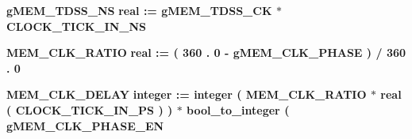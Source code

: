 \begin{DoxyCompactItemize}
\item 
{\bf g\+M\+E\+M\+\_\+\+T\+D\+S\+S\+\_\+\+NS} {\bfseries \textcolor{comment}{real}\textcolor{vhdlchar}{ }\textcolor{vhdlchar}{ }\textcolor{vhdlchar}{\+:}\textcolor{vhdlchar}{=}\textcolor{vhdlchar}{ }\textcolor{vhdlchar}{ }\textcolor{vhdlchar}{ }\textcolor{vhdlchar}{ }{\bfseries {\bf g\+M\+E\+M\+\_\+\+T\+D\+S\+S\+\_\+\+CK}} \textcolor{vhdlchar}{$\ast$}\textcolor{vhdlchar}{ }\textcolor{vhdlchar}{ }\textcolor{vhdlchar}{ }{\bfseries {\bf C\+L\+O\+C\+K\+\_\+\+T\+I\+C\+K\+\_\+\+I\+N\+\_\+\+NS}} \textcolor{vhdlchar}{ }} 
\item 
{\bf M\+E\+M\+\_\+\+C\+L\+K\+\_\+\+R\+A\+T\+IO} {\bfseries \textcolor{comment}{real}\textcolor{vhdlchar}{ }\textcolor{vhdlchar}{ }\textcolor{vhdlchar}{\+:}\textcolor{vhdlchar}{=}\textcolor{vhdlchar}{ }\textcolor{vhdlchar}{(}\textcolor{vhdlchar}{ }\textcolor{vhdlchar}{ } \textcolor{vhdldigit}{360} \textcolor{vhdlchar}{.} \textcolor{vhdldigit}{0} \textcolor{vhdlchar}{-\/}\textcolor{vhdlchar}{ }\textcolor{vhdlchar}{ }\textcolor{vhdlchar}{ }{\bfseries {\bf g\+M\+E\+M\+\_\+\+C\+L\+K\+\_\+\+P\+H\+A\+SE}} \textcolor{vhdlchar}{ }\textcolor{vhdlchar}{)}\textcolor{vhdlchar}{ }\textcolor{vhdlchar}{/}\textcolor{vhdlchar}{ } \textcolor{vhdldigit}{360} \textcolor{vhdlchar}{.} \textcolor{vhdldigit}{0} \textcolor{vhdlchar}{ }} 
\item 
{\bf M\+E\+M\+\_\+\+C\+L\+K\+\_\+\+D\+E\+L\+AY} {\bfseries \textcolor{comment}{integer}\textcolor{vhdlchar}{ }\textcolor{vhdlchar}{ }\textcolor{vhdlchar}{\+:}\textcolor{vhdlchar}{=}\textcolor{vhdlchar}{ }\textcolor{vhdlchar}{ }\textcolor{vhdlchar}{ }\textcolor{vhdlchar}{ }\textcolor{comment}{integer}\textcolor{vhdlchar}{ }\textcolor{vhdlchar}{(}\textcolor{vhdlchar}{ }\textcolor{vhdlchar}{ }\textcolor{vhdlchar}{ }\textcolor{vhdlchar}{ }{\bfseries {\bf M\+E\+M\+\_\+\+C\+L\+K\+\_\+\+R\+A\+T\+IO}} \textcolor{vhdlchar}{$\ast$}\textcolor{vhdlchar}{ }\textcolor{vhdlchar}{ }\textcolor{vhdlchar}{ }\textcolor{comment}{real}\textcolor{vhdlchar}{ }\textcolor{vhdlchar}{(}\textcolor{vhdlchar}{ }{\bfseries {\bf C\+L\+O\+C\+K\+\_\+\+T\+I\+C\+K\+\_\+\+I\+N\+\_\+\+PS}} \textcolor{vhdlchar}{ }\textcolor{vhdlchar}{ }\textcolor{vhdlchar}{)}\textcolor{vhdlchar}{ }\textcolor{vhdlchar}{)}\textcolor{vhdlchar}{ }\textcolor{vhdlchar}{$\ast$}\textcolor{vhdlchar}{ }\textcolor{vhdlchar}{ }\textcolor{vhdlchar}{ }\textcolor{vhdlchar}{bool\+\_\+to\+\_\+integer}\textcolor{vhdlchar}{ }\textcolor{vhdlchar}{(}\textcolor{vhdlchar}{ }{\bfseries {\bf g\+M\+E\+M\+\_\+\+C\+L\+K\+\_\+\+P\+H\+A\+S\+E\+\_\+\+EN}} \textcolor{vhdlchar}{ }} 
\end{DoxyCompactItemize}
